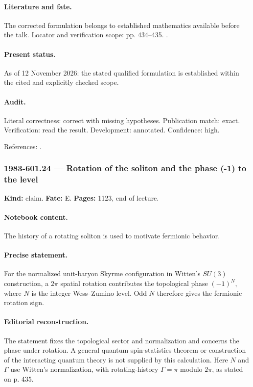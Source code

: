 \paragraph{Literature and fate.} The corrected formulation belongs to established mathematics available before the talk. Locator and verification scope: pp. 434--435. \cite{witten1983current}.

\paragraph{Present status.} As of 12 November 2026: the stated qualified formulation is established within the cited and explicitly checked scope.

\paragraph{Audit.} Literal correctness: correct with missing hypotheses. Publication match: exact. Verification: read the result. Development: annotated. Confidence: high.

\noindent References: \citep{witten1983current}.\par

\subsubsection{1983-601.24 --- Rotation of the soliton and the phase (-1) to the level}

\label{item:1983-601.24}

\noindent\textbf{Kind:} claim. \textbf{Fate:} E. \textbf{Pages:} 1123, end of lecture.\par

\paragraph{Notebook content.} The history of a rotating soliton is used to motivate fermionic behavior.

\paragraph{Precise statement.} For the normalized unit-baryon Skyrme configuration in Witten's \(SU(3)\) construction, a \(2\pi\) spatial rotation contributes the topological phase \((-1)^N\), where \(N\) is the integer Wess--Zumino level. Odd \(N\) therefore gives the fermionic rotation sign.

\paragraph{Editorial reconstruction.} The statement fixes the topological sector and normalization and concerns the phase under rotation. A general quantum spin-statistics theorem or construction of the interacting quantum theory is not supplied by this calculation. Here \(N\) and \(\Gamma\) use Witten's normalization, with rotating-history \(\Gamma=\pi\) modulo \(2\pi\), as stated on p. 435.

